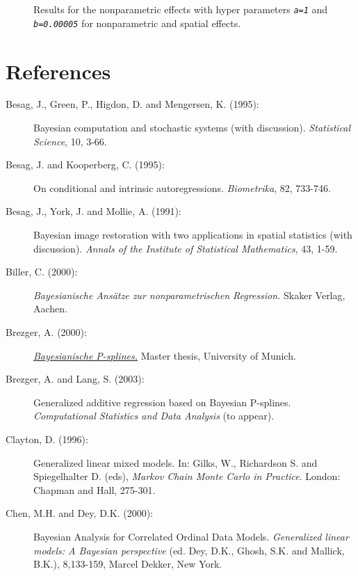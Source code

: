 \begin{figure}[ht]
\begin{center}
 {\it\caption{Results
for the nonparametric effects with hyper parameters {\em\tt a=1} and
{\em\tt b=0.00005} for nonparametric and spatial
effects.\label{zambia_mcmc_sensi3}}}
\end{center}
\end{figure}

\section{References}
\label{zambia_bayesregref}

\begin{description}

\item[Besag, J., Green, P., Higdon, D. and Mengersen, K. (1995):]
 Bayesian computation and stochastic systems (with discussion).
{\em Statistical Science}, 10, 3-66.

\item[Besag, J. and Kooperberg, C. (1995):] On conditional and intrinsic autoregressions.
{\em Biometrika}, 82, 733-746.

\item[Besag, J., York, J. and Mollie, A. (1991):]
Bayesian image restoration with two applications in spatial
statistics (with discussion). {\em Annals of the Institute of
Statistical Mathematics}, 43, 1-59.

\item[Biller, C. (2000):] {\em Bayesianische Ans\"atze zur nonparametrischen Regression.}
Skaker Verlag, Aachen.

\item[Brezger, A. (2000):] \href{http://www.stat.uni-muenchen.de/~andib}
{\em Bayesianische P-splines.} Master thesis, University of Munich.

\item[Brezger, A. and Lang, S. (2003):]
Generalized additive regression based on Bayesian P-splines. {\em
Computational Statistics and Data Analysis} (to appear).

\item[Clayton, D. (1996):] Generalized linear mixed models. In: Gilks, W., Richardson S. and
Spiegelhalter D. (eds), {\em Markov Chain Monte Carlo in
Practice}. London: Chapman and Hall, 275-301.

\item[Chen, M.H. and Dey, D.K. (2000):] Bayesian Analysis for Correlated Ordinal Data Models.
{\em Generalized linear models: A Bayesian perspective} (ed. Dey,
D.K., Ghosh, S.K. and Mallick, B.K.), 8,133-159, Marcel Dekker,
New York.


\end{description}
